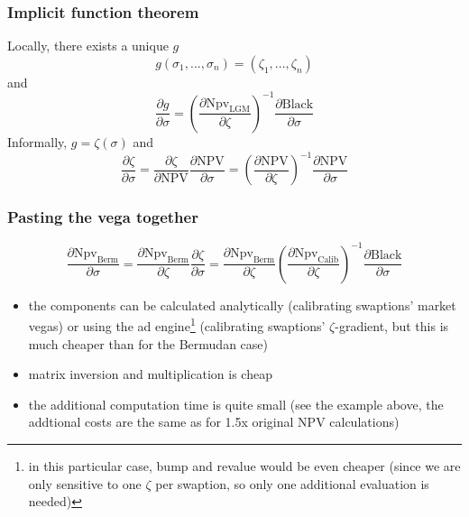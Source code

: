 \documentclass[10pt,German]{beamer}
\begin{document}
\begin{frame}[fragile]
\frametitle{Implicit function theorem}
Locally, there exists a unique $g$
\begin{equation}
g(\sigma_1, ... , \sigma_n) = (\zeta_1, ..., \zeta_n)
\end{equation}
and
\begin{equation}
\frac{\partial g}{\partial \sigma} = \left( \frac{\partial \text{Npv}_{\text{LGM}}}{\partial \zeta} \right) ^ {-1} \frac{\partial \text{Black}}{\partial \sigma}
\end{equation}
Informally, $g = \zeta(\sigma)$ and
\begin{equation}
\frac{\partial \zeta}{\partial \sigma} = \frac{\partial \zeta}{\partial \text{NPV}} \frac{\partial \text{NPV}}{\partial \sigma} = 
\left( \frac{\partial \text{NPV}}{\partial \zeta}\right)^{-1} \frac{\partial \text{NPV}}{\partial \sigma}
\end{equation}
\end{frame}

\begin{frame}[fragile]
\frametitle{Pasting the vega together}
\begin{equation*}
\frac{\partial \text{Npv}_\text{Berm}}{\partial \sigma} = \frac{\partial \text{Npv}_\text{Berm}}{\partial \zeta} \frac{\partial \zeta}{\partial \sigma} = \frac{\partial \text{Npv}_\text{Berm}}{\partial \zeta} \left( \frac{\partial \text{Npv}_\text{Calib}}{\partial \zeta} \right) ^ {-1} \frac{\partial \text{Black}}{\partial \sigma}
\end{equation*}
\begin{itemize}
\item the components can be calculated analytically (calibrating swaptions' market vegas) or using the ad engine\footnote{in this particular case, bump and revalue would be even cheaper (since we are only sensitive to one $\zeta$ per swaption, so only one additional evaluation is needed)} (calibrating swaptions' $\zeta$-gradient, but this is much cheaper than for the Bermudan case)
\item matrix inversion and multiplication is cheap
\item the additional computation time is quite small (see the example above, the addtional costs are the same as for 1.5x original NPV calculations)
\end{itemize}
\end{frame}
\end{document}
